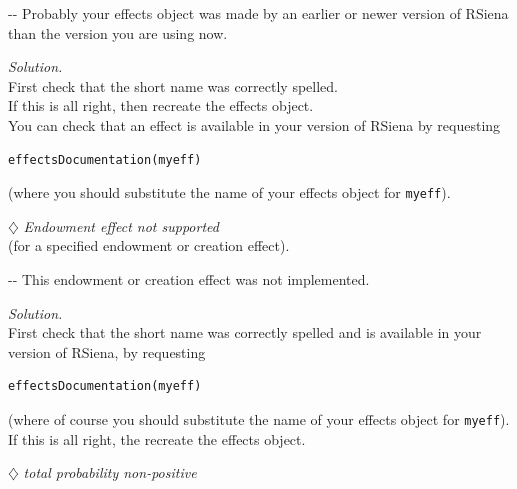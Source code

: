 \documentclass[a4paper,fleqn,11pt]{article}
\makeatletter
\newcommand{\+}{\, + \,}
\newcommand{\rs}{{\sf RSiena}}
\newenvironment{indentation}[2]
{\par \setlength{\leftmargin}{#1}       \setlength{\rightmargin}{#2}
  \advance\linewidth -\leftmargin       \advance\linewidth -\rightmargin
  \advance\@totalleftmargin\leftmargin  \@setpar{{\@@par}}%
  \parshape 1 \@totalleftmargin         \linewidth \ignorespaces}{\par}
\makeatother
\begin{document}
\begin{indentation}{0.04\textwidth}{0pt}
\noindent
Probably your effects object was made by an earlier or newer version
of {\rs} than the version you are using now.
\smallskip

\noindent
\emph{Solution.} \\
First check that the short name was correctly spelled.\\
If this is all right, then recreate the effects object.\\
You can check that an effect is available in your version of
{\rs} by requesting
\begin{verbatim}
effectsDocumentation(myeff)
\end{verbatim}
(where you should substitute the name of your effects object
for \texttt{myeff}).
\end{indentation}
\bigskip


\noindent $\diamondsuit$ \emph{Endowment effect not supported}\\
(for a specified endowment or creation effect).
\smallskip

\begin{indentation}{0.04\textwidth}{0pt}
\noindent
This endowment or creation effect was not implemented.
\smallskip

\noindent
\emph{Solution.} \\
First check that the short name was correctly spelled and
is available in your version of {\rs}, by requesting
\begin{verbatim}
effectsDocumentation(myeff)
\end{verbatim}
(where of course you should substitute the name of your effects object
for \texttt{myeff}).
If this is all right, the recreate the effects object.
\end{indentation}
\bigskip



\noindent $\diamondsuit$ \emph{total probability non-positive}\\
\smallskip
\end{document}
